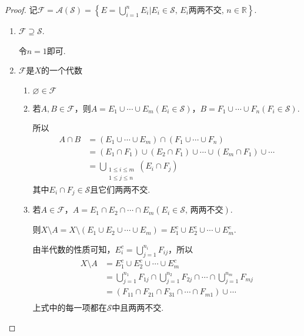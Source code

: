 \begin{proof}
    记$\mathcal{F}=\mathcal{A}(\mathcal{S})=\left\{E=\bigcup_{i=1}^n{E_i}\bigg| E_i\in\mathcal{S},\,E_i\text{两两不交},\,n\in\mathbb{R} \right\}$.\par
    \begin{enumerate}[label=(\arabic*)]
        \item $\mathcal{F}\supseteq\mathcal{S}$.\par
        令$n=1$即可.
        \item $\mathcal{F}$是$X$的一个代数
        \begin{enumerate}[label=(\roman*)]
            \item $\varnothing\in\mathcal{F}$
            \item 若$A,B\in\mathcal{F}$，则$A=E_1\cup\cdots\cup E_m(E_i\in\mathcal{S})$，$B=F_1\cup\cdots\cup F_n (F_i\in\mathcal{S})$.\par
            所以
            {\setlength{\jot}{-2pt}\begin{align*}
                A\cap B&=(E_1\cup\cdots\cup E_m)\cap(F_1\cup\cdots\cup F_n)\\
                &=(E_1\cap F_1)\cup(E_2\cap F_1)\cup\cdots\cup (E_m\cap F_1)\cup\cdots\\
                &=\bigcup_{\substack{1\leqslant i\leqslant m\\ 1\leqslant j\leqslant n}}(E_i\cap F_j)
            \end{align*}}
            其中$E_i\cap F_j\in\mathcal{S}$且它们两两不交.
            \item 若$A\in\mathcal{F}$，$A=E_1\cap E_2\cap\cdots\cap E_m(E_i\in\mathcal{S},\,\text{两两不交})$.\par
            则$X\setminus A = X\setminus (E_1\cup E_2\cup\cdots\cup E_m)=E_1^c\cup E_2^c\cup\cdots\cup E_m^c$.\par
            由半代数的性质可知，$E_i^c=\bigcup_{j=1}^{n_i}{F_{ij}}$，所以
            {\setlength{\jot}{-2pt}\setlength\belowdisplayskip{-10pt}\begin{align*}
                X\setminus A&=E_1^c\cup E_2^c\cup\cdots\cup E_m^c\\
                &=\bigcup_{j=1}^{n_1}{F_{1j}}\cap\bigcup_{j=1}^{n_2}{F_{2j}}\cap\cdots\cap\bigcup_{j=1}^{n_m}{F_{mj}} \\
                &=(F_{11}\cap F_{21}\cap F_{31}\cap\cdots\cap F_{m1})\cup\cdots \\
            \end{align*}}
            上式中的每一项都在$\mathcal{S}$中且两两不交.

\end{enumerate}
\end{enumerate}
\end{proof}
